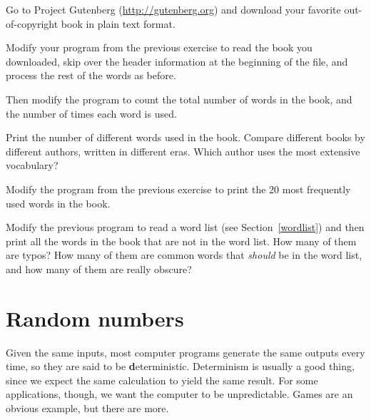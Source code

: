 \documentclass[
DIV=11,
fontsize=13,
twoside,
headinclude=false,
titlepage=firstiscover,
abstract=true,
headsepline=true,
footsepline=true,
chapterprefix=true, %
headings=big,
bibliography=totoc,%
captions=tableheading
]{scrbook}
\theoremstyle{definition}
\begin{document}
\begin{exercise}
\normalfont
{}

Go to Project Gutenberg (\url{http://gutenberg.org}) and download 
your favorite out-of-copyright book in plain text format.

Modify your program from the previous exercise to read the book
you downloaded, skip over the header information at the beginning
of the file, and process the rest of the words as before.

Then modify the program to count the total number of words in
the book, and the number of times each word is used.

Print the number of different words used in the book.  Compare
different books by different authors, written in different eras.
Which author uses the most extensive vocabulary?
\end{exercise}


\begin{exercise}
\normalfont

Modify the program from the previous exercise to print the
20 most frequently used words in the book.

\end{exercise}


\begin{exercise}
\normalfont

Modify the previous program to read a word list (see
Section~\ref{wordlist}) and then print all the words in the book that
are not in the word list.  How many of them are typos?  How many of
them are common words that {\em should} be in the word list, and how
many of them are really obscure?

\end{exercise}


\section{Random numbers}

Given the same inputs, most computer programs generate the same
outputs every time, so they are said to be {\textbf deterministic}.
Determinism is usually a good thing, since we expect the same
calculation to yield the same result.  For some applications, though,
we want the computer to be unpredictable.  Games are an obvious
example, but there are more.
\end{document}
